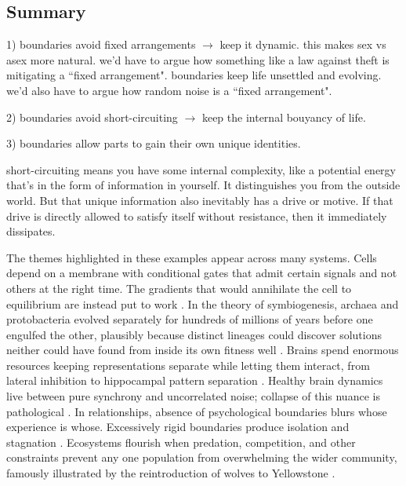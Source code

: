 \documentclass[11pt]{article}
\begin{document}
\subsection{Summary} 


1) boundaries avoid fixed arrangements $\rightarrow$ keep it dynamic. this makes sex vs asex more natural. we'd have to argue how something like a law against theft is mitigating a ``fixed arrangement". boundaries keep life unsettled and evolving. we'd also have to argue how random noise is a ``fixed arrangement".

2) boundaries avoid short-circuiting $\rightarrow$ keep the internal bouyancy of life. 

3) boundaries allow parts to gain their own unique identities.


short-circuiting means you have some internal complexity, like a potential energy that's in the form of information in yourself. It distinguishes you from the outside world. But that unique information also inevitably has a drive or motive. If that drive is directly allowed to satisfy itself without resistance, then it immediately dissipates. 


The themes highlighted in these examples appear across many systems. Cells depend on a membrane with conditional gates that admit certain signals and not others at the right time. The gradients that would annihilate the cell to equilibrium are instead put to work \citep{alberts2022molecular}. In the theory of symbiogenesis, archaea and protobacteria evolved separately for hundreds of millions of years before one engulfed the other, plausibly because distinct lineages could discover solutions neither could have found from inside its own fitness well \citep{margulis1995what, lane2010energetics}. Brains spend enormous resources keeping representations separate while letting them interact, from lateral inhibition to hippocampal pattern separation \citep{kurth2023replay}. Healthy brain dynamics live between pure synchrony and uncorrelated noise; collapse of this nuance is pathological \citep{beggs2003neuronal, hammond2007pathological}. In relationships, absence of psychological boundaries blurs whose experience is whose. Excessively rigid boundaries produce isolation and stagnation \citep{gabbard1995boundaries, perls1951gestalt, minuchin1974families}. Ecosystems flourish when predation, competition, and other constraints prevent any one population from overwhelming the wider community, famously illustrated by the reintroduction of wolves to Yellowstone \citep{ripple2012trophic}.
\end{document}
